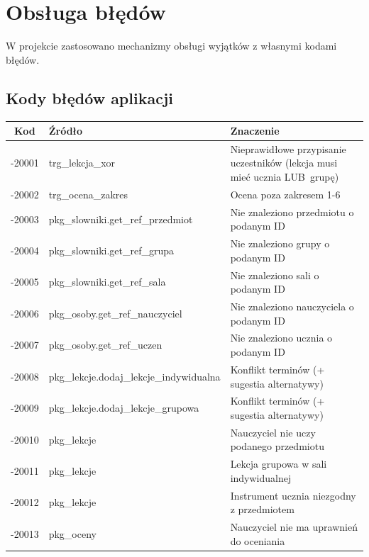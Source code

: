 \documentclass[12pt,a4paper]{article}
\begin{document}
\newpage
\section{Obsługa błędów}

W projekcie zastosowano mechanizmy obsługi wyjątków z własnymi kodami błędów.

\subsection{Kody błędów aplikacji}

\begin{table}[h]
\centering
\small
\begin{tabular}{|c|l|p{6cm}|}
\hline
\textbf{Kod} & \textbf{Źródło} & \textbf{Znaczenie} \\
\hline
-20001 & trg\_lekcja\_xor & Nieprawidłowe przypisanie uczestników (lekcja musi mieć ucznia LUB~grupę) \\
\hline
-20002 & trg\_ocena\_zakres & Ocena poza zakresem 1-6 \\
\hline
-20003 & pkg\_slowniki.get\_ref\_przedmiot & Nie znaleziono przedmiotu o podanym ID \\
\hline
-20004 & pkg\_slowniki.get\_ref\_grupa & Nie znaleziono grupy o podanym ID \\
\hline
-20005 & pkg\_slowniki.get\_ref\_sala & Nie znaleziono sali o podanym ID \\
\hline
-20006 & pkg\_osoby.get\_ref\_nauczyciel & Nie znaleziono nauczyciela o podanym ID \\
\hline
-20007 & pkg\_osoby.get\_ref\_uczen & Nie znaleziono ucznia o podanym ID \\
\hline
-20008 & pkg\_lekcje.dodaj\_lekcje\_indywidualna & Konflikt terminów (+ sugestia alternatywy) \\
\hline
-20009 & pkg\_lekcje.dodaj\_lekcje\_grupowa & Konflikt terminów (+ sugestia alternatywy) \\
\hline
-20010 & pkg\_lekcje & Nauczyciel nie uczy podanego przedmiotu \\
\hline
-20011 & pkg\_lekcje & Lekcja grupowa w sali indywidualnej \\
\hline
-20012 & pkg\_lekcje & Instrument ucznia niezgodny z przedmiotem \\
\hline
-20013 & pkg\_oceny & Nauczyciel nie ma uprawnień do oceniania \\

\end{tabular}
\end{table}
\end{document}
